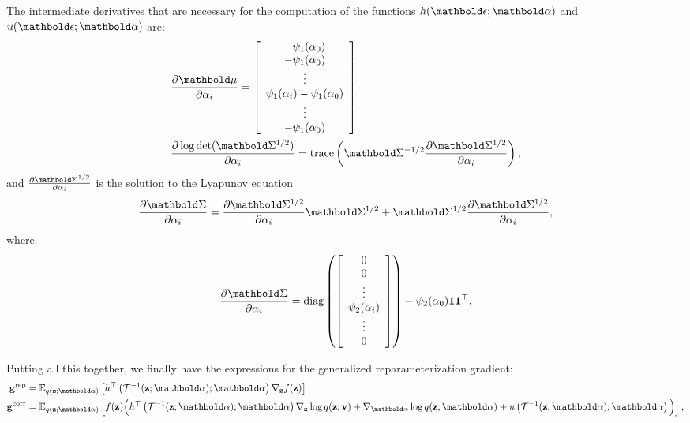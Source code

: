 \documentclass{article}
\begin{document}
The intermediate derivatives that are necessary for the computation of the functions $\hfun(\beps;\balpha)$ and $\ufun(\beps;\balpha)$ are:
\begin{align}
    & \frac{\partial\bmu}{\partial\alpha_i} = 
  \left[
  \begin{array}{c}
   -\psi_1(\alpha_0) \\
   -\psi_1(\alpha_0) \\
   \vdots \\
   \psi_1(\alpha_i)-\psi_1(\alpha_0) \\
   \vdots \\
   -\psi_1(\alpha_0) \\
   \end{array}
  \right] \\
    & \frac{\partial \log\det(\bSigma^{1/2})}{\partial\alpha_i} = \textrm{trace}\left( \bSigma^{-1/2} \frac{\partial \bSigma^{1/2}}{\partial\alpha_i} \right),
\end{align}
and $\frac{\partial \bSigma^{1/2}}{\partial\alpha_i}$ is the solution to the Lyapunov equation
\begin{equation}
 \frac{\partial \bSigma}{\partial\alpha_i} = \frac{\partial \bSigma^{1/2}}{\partial\alpha_i} \bSigma^{1/2}+\bSigma^{1/2}\frac{\partial \bSigma^{1/2}}{\partial\alpha_i},
\end{equation}
where
\begin{equation}
 \frac{\partial\bSigma}{\partial\alpha_i} = \textrm{diag}\left(
  \left[
  \begin{array}{c}
   0 \\
   0 \\
   \vdots \\
   \psi_2(\alpha_i) \\
   \vdots \\
   0 \\
   \end{array}
  \right]
 \right) - \psi_2(\alpha_0) \bone\bone^\top.
\end{equation}

Putting all this together, we finally have the expressions for the generalized reparameterization gradient:
\begin{align}
    \bg^{\textrm{rep}} & = \E{q(\bz;\balpha)}{\hfun^\top\left( \Tcal^{-1}(\bz;\balpha);\balpha \right)\nabla_{\bz}f(\bz)},\\
    \bg^{\textrm{corr}} & = \E{q(\bz;\balpha)}{f(\bz) \Big( \hfun^\top\left(\Tcal^{-1}(\bz;\balpha);\balpha\right)\nabla_{\bz}\log q(\bz;\bv) + \nabla_{\balpha}\log q(\bz;\balpha)+ \ufun\left(\Tcal^{-1}(\bz;\balpha);\balpha \right) \Big)},
\end{align}
\end{document}
